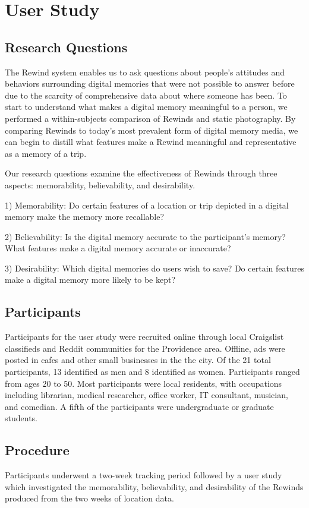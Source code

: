 \documentclass{sigchi}
\begin{document}
\section{User Study}
\subsection{Research Questions}
The Rewind system enables us to ask questions about people's attitudes and behaviors surrounding digital memories that were not possible to answer before due to the scarcity of comprehensive data about where someone has been. To start to understand what makes a digital memory meaningful to a person, we performed a within-subjects comparison of Rewinds and static photography. By comparing Rewinds to today's most prevalent form of digital memory media, we can begin to distill what features make a Rewind meaningful and representative as a memory of a trip.

Our research questions examine the effectiveness of Rewinds through three aspects: memorability, believability, and desirability.

1) Memorability: Do certain features of a location or trip depicted in a digital memory make the memory more recallable? 

2) Believability:  Is the digital memory accurate to the participant's memory? What features make a digital memory accurate or inaccurate?

3) Desirability: Which digital memories do users wish to save? Do certain features make a digital memory more likely to be kept?

\subsection{Participants}
Participants for the user study were recruited online through local Craigslist classifieds and Reddit communities for the Providence area. Offline, ads were posted in cafes and other small businesses in the the city. Of the 21 total participants, 13 identified as men and 8 identified as women. Participants ranged from ages 20 to 50. Most participants were local residents, with occupations including librarian, medical researcher, office worker, IT consultant, musician, and comedian. A fifth of the participants were undergraduate or graduate students.

\subsection{Procedure}
Participants underwent a two-week tracking period followed by a user study which investigated the memorability, believability, and desirability of the Rewinds produced from the two weeks of location data.
\end{document}
